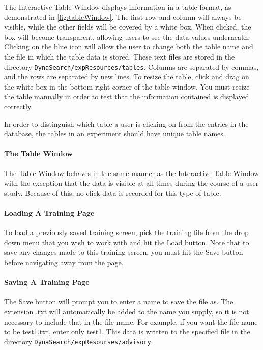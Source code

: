 \documentclass[article]{ij4uq}              %
\begin{document}
The Interactive Table Window displays information in a table format, as demonstrated in \ref{fig:tableWindow}.  The first row and column will always be visible, while the other fields will be covered by a white box.  When clicked, the box will become transparent, allowing users to see the data values underneath.  Clicking on the blue icon will allow the user to change both the table name and the file in which the table data is stored. These text files are stored in the directory \texttt{DynaSearch/expResources/tables}.  Columns are separated by commas, and the rows are separated by new lines. To resize the table, click and drag on the white box in the bottom right corner of the table window. You must resize the table manually in order to test that the information contained is displayed correctly.

In order to distinguish which table a user is clicking on from the entries in the database, the tables in an experiment should have unique table names.

\paragraph{The Table Window}

The Table Window behaves in the same manner as the Interactive Table Window with the exception that the data is visible at all times during the course of a user study.  Because of this, no click data is recorded for this type of table.

\paragraph{Loading A Training Page}
To load a previously saved training screen, pick the training file from the drop down menu that you wish to work with and hit the Load button. Note that to save any changes made to this training screen, you must hit the Save button before navigating away from the page.

\paragraph{Saving A Training Page}
The Save button will prompt you to enter a name to save the file as. The extension .txt will automatically be added to the name you supply, so it is not necessary to include that in the file name. For example, if you want the file name to be test1.txt, enter only test1.  This data is written to the specified file in the directory \texttt{DynaSearch/expResourses/advisory}.
\end{document}
